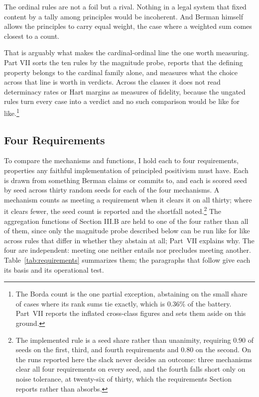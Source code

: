 The ordinal rules are not a foil but a rival. Nothing in a legal system
that fixed content by a tally among principles would be incoherent. And
Berman himself allows the principles to carry equal weight, the case
where a weighted sum comes closest to a count.

That is arguably
what makes the cardinal-ordinal line the one worth measuring. Part VII sorts the ten rules by the magnitude
probe, reports that the defining property belongs to the cardinal family alone,
and measures what the choice across that line is worth in verdicts. Across the classes it does not read determinacy rates or Hart margins as
measures of fidelity, because the ungated rules turn every case into a verdict
and no such comparison would be like for like.\footnote{The Borda count is the
one partial exception, abstaining on the small share of cases where its rank
sums tie exactly, which is $0.36\%$ of the battery. Part~VII reports the
inflated cross-class figures and sets them aside on this ground.}

\subsection{Four Requirements}

To compare the mechanisms and functions, I hold each to four
requirements, properties any faithful implementation of principled
positivism must have. Each is drawn from something Berman claims or commits
to, and each is scored seed by seed across thirty random seeds for each of the
four mechanisms. A mechanism counts as meeting a requirement when it clears it
on all thirty; where it clears fewer, the seed count is reported and the
shortfall noted.\footnote{The implemented rule is a seed share rather than
unanimity, requiring $0.90$ of seeds on the first, third, and fourth
requirements and $0.80$ on the second. On the runs reported here the slack
never decides an outcome: three mechanisms clear all four requirements on
every seed, and the fourth falls short only on noise tolerance, at twenty-six
of thirty, which the requirements Section reports rather than absorbs.} The
aggregation functions of Section III.B are held to one of the four rather than
all of them, since only the magnitude probe described below can be run like
for like
across rules that differ in whether they abstain at all; Part~VII explains
why. The four are independent: meeting one neither entails nor precludes
meeting another. Table~\ref{tab:requirements} summarizes them;
the paragraphs that follow give each its basis and its operational test.


